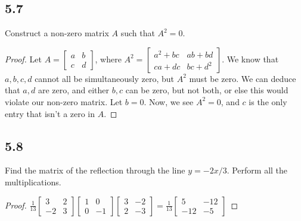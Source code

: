 \documentclass{amsart}
\begin{document}
\subsection*{5.7}Construct a non-zero matrix $A$ such that $A^2 = 0$.
\begin{proof}
    Let $A = \begin{bmatrix}
        a & b \\ c & d
    \end{bmatrix}$, where $A^2 = \begin{bmatrix}
        a^2 + bc & ab + bd \\ ca + dc & bc + d^2
    \end{bmatrix}$. We know that $a,b,c,d$ cannot all be simultaneously zero, but $A^2$ must be zero. We can deduce that $a,d$ are zero, and either $b,c$ can be zero, but not both, or else this would violate our non-zero matrix. Let $b = 0$. Now, we see $A^2 = 0$, and $c$ is the only entry that isn't a zero in $A$. 
\end{proof}
\subsection*{5.8} Find the matrix of the reflection through the line $y = -2x/3$. Perform all the multiplications. 
\begin{proof}
    $\frac{1}{13} \begin{bmatrix} 3 & 2 \\ -2 & 3 \end{bmatrix} \begin{bmatrix} 1 & 0 \\ 0 & -1 \end{bmatrix} \begin{bmatrix} 3 & -2 \\ 2 & -3 \end{bmatrix} = \frac{1}{13}\begin{bmatrix} 5 & -12 \\ -12 & -5 \end{bmatrix}$
\end{proof}
\end{document}
